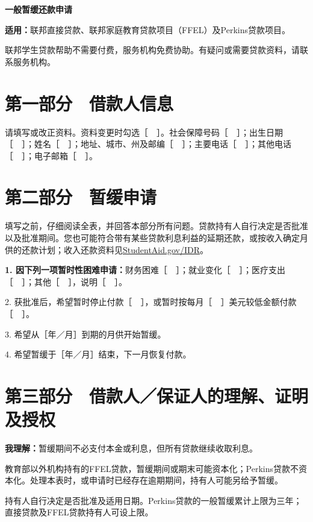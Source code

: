 \documentclass[UTF8,fontset=none,11pt,a4paper]{ctexart}
\begin{document}
{\noindent\fontsize{20}{25}\selectfont\bfseries 一般暂缓还款申请\par}
\vspace{10pt}
\textbf{适用：}联邦直接贷款、联邦家庭教育贷款项目（FFEL）及Perkins贷\allowbreak\mbox{款项目。}


联邦学生贷款帮助不需要付费，服务机构免费协助。有疑问或需要贷款资料，请联系\allowbreak\mbox{服务机构。}


\section*{第一部分　借款人信息}
请填写或改正资料。资料变更时勾选［　］。社会保障号码［　］；出生日期［　］；姓名［　］；地址、城市、州及邮编［　］；主要电话［　］；其他电话［　］；电子邮箱［　］。


\section*{第二部分　暂缓申请}
填写之前，仔细阅读全表，并回答本部分所有问题。贷款持有人自行决定是否批准以及批准期间。您也可能符合带有某些贷款利息利益的延期还款，或按收入确定月供的还款计划；收入还款资料见\url{StudentAid.gov/IDR}。


\textbf{1. 因下列一项暂时性困难申请：}财务困难［　］；就业变化［　］；医疗支出［　］；其他［　］，说明［　］。


2. 获批准后，希望暂时停止付款［　］，或暂时按每月［　］美元较低金额付款［　］。


3. 希望从［年／月］到期的月供\allowbreak\mbox{开始暂缓。}


4. 希望暂缓于［年／月］结束，下一月\allowbreak\mbox{恢复付款。}


\section*{第三部分　借款人／保证人的理解、证明及授权}
\textbf{我理解：}暂缓期间不必支付本金或利息，但所有贷款继续\allowbreak\mbox{收取利息。}


教育部以外机构持有的FFEL贷款，暂缓期间或期末可能资本化；Perkins贷款不资本化。处理本表时，或申请时已经存在逾期期间，持有人可能另\allowbreak\mbox{给予暂缓。}


持有人自行决定是否批准及适用日期。Perkins贷款的一般暂缓累计上限为三年；直接贷款及FFEL贷款持有人\allowbreak\mbox{可设上限。}
\end{document}
